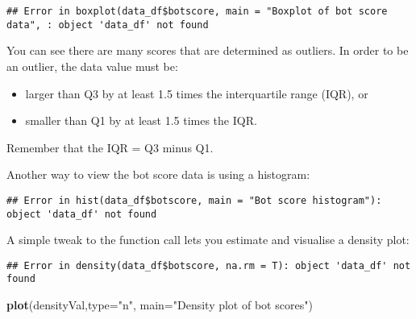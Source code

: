 \documentclass[]{article}
\newenvironment{Shaded}{\begin{snugshade}}{\end{snugshade}}
\newcommand{\DataTypeTok}[1]{\textcolor[rgb]{0.13,0.29,0.53}{#1}}
\newcommand{\KeywordTok}[1]{\textcolor[rgb]{0.13,0.29,0.53}{\textbf{#1}}}
\newcommand{\NormalTok}[1]{#1}
\newcommand{\OperatorTok}[1]{\textcolor[rgb]{0.81,0.36,0.00}{\textbf{#1}}}
\newcommand{\StringTok}[1]{\textcolor[rgb]{0.31,0.60,0.02}{#1}}
\providecommand{\tightlist}{%
  \setlength{\itemsep}{0pt}\setlength{\parskip}{0pt}}
\begin{document}
\begin{verbatim}
## Error in boxplot(data_df$botscore, main = "Boxplot of bot score data", : object 'data_df' not found
\end{verbatim}

You can see there are many scores that are determined as outliers. In
order to be an outlier, the data value must be:

\begin{itemize}
\tightlist
\item
  larger than Q3 by at least 1.5 times the interquartile range (IQR), or
\item
  smaller than Q1 by at least 1.5 times the IQR.
\end{itemize}

Remember that the IQR = Q3 minus Q1.

Another way to view the bot score data is using a histogram:

\begin{Shaded}
\end{Shaded}

\begin{verbatim}
## Error in hist(data_df$botscore, main = "Bot score histogram"): object 'data_df' not found
\end{verbatim}

A simple tweak to the function call lets you estimate and visualise a
density plot:

\begin{Shaded}
\end{Shaded}

\begin{verbatim}
## Error in density(data_df$botscore, na.rm = T): object 'data_df' not found
\end{verbatim}

\begin{Shaded}
\begin{Highlighting}[]
\KeywordTok{plot}\NormalTok{(densityVal,}\DataTypeTok{type=}\StringTok{"n"}\NormalTok{, }\DataTypeTok{main=}\StringTok{"Density plot of bot scores"}\NormalTok{)}
\end{Highlighting}
\end{Shaded}
\end{document}
